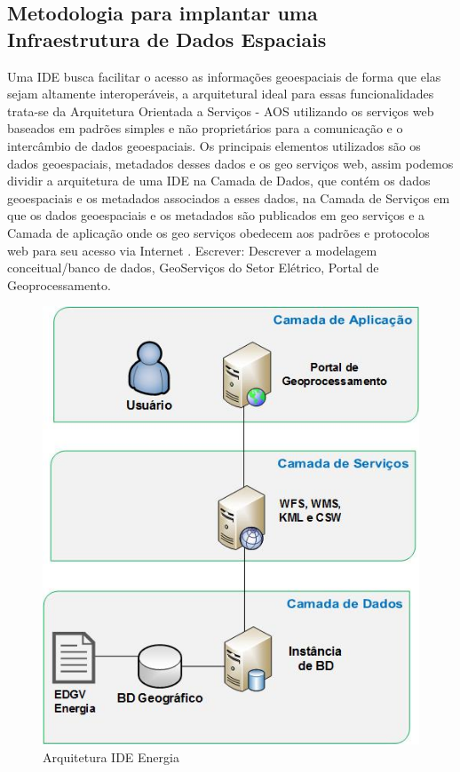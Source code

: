 \documentclass[preprint,authoryear,11pt]{elsarticle}
\begin{document}
\begin{multicols}{2}
\section{Metodologia para implantar uma Infraestrutura de Dados Espaciais}
\label{sec4}

Uma IDE busca facilitar o acesso as informações geoespaciais de forma que elas sejam altamente interoperáveis, a arquitetural ideal para essas funcionalidades trata-se da Arquitetura Orientada a Serviços - AOS utilizando os serviços web baseados em padrões simples e não proprietários para a comunicação e o intercâmbio de dados geoespaciais. Os principais elementos utilizados são os dados geoespaciais, metadados desses dados e os geo serviços web, assim podemos dividir a arquitetura de uma IDE na Camada de Dados, que contém os dados geoespaciais e os metadados associados a esses dados, na Camada de Serviços em que os dados geoespaciais e os metadados são publicados em geo serviços e a Camada de aplicação onde os geo serviços obedecem aos padrões e protocolos web para seu acesso via Internet \citep{Kobben2013TowardsInfrastructure,Li2011Semantic-basedInfrastructure,Miro2010MetadataSystems}.
Escrever: Descrever a modelagem conceitual/banco de dados, GeoServiços do Setor Elétrico, Portal de Geoprocessamento.
\end{multicols}

\begin{figure}[H]
    \centering
    \includegraphics[scale=0.7]{fig3}
    \caption{Arquitetura IDE Energia}
    \label{fig:my_label}
\end{figure}
\end{document}
